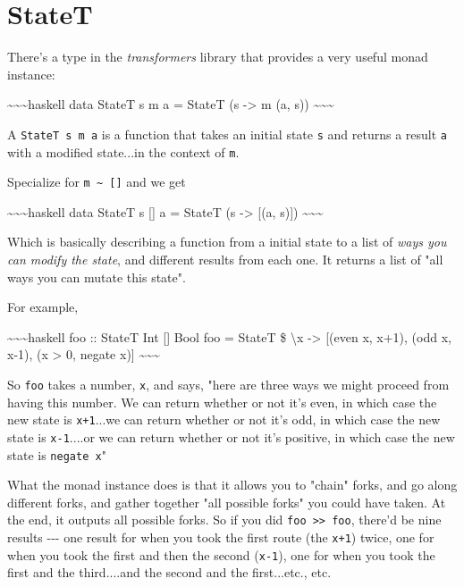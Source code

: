 \documentclass[]{article}
\begin{document}
\section{StateT}

There's a type in the \emph{transformers} library that provides a very useful
monad instance:

\textasciitilde{}\textasciitilde{}\textasciitilde{}haskell data StateT s m a =
StateT (s -\textgreater{} m (a, s))
\textasciitilde{}\textasciitilde{}\textasciitilde{}

A \texttt{StateT\ s\ m\ a} is a function that takes an initial state \texttt{s}
and returns a result \texttt{a} with a modified state...in the context of
\texttt{m}.

Specialize for \texttt{m\ \textasciitilde{}\ {[}{]}} and we get

\textasciitilde{}\textasciitilde{}\textasciitilde{}haskell data StateT s {[}{]}
a = StateT (s -\textgreater{} {[}(a, s){]})
\textasciitilde{}\textasciitilde{}\textasciitilde{}

Which is basically describing a function from a initial state to a list of
\emph{ways you can modify the state}, and different results from each one. It
returns a list of "all ways you can mutate this state".

For example,

\textasciitilde{}\textasciitilde{}\textasciitilde{}haskell foo :: StateT Int
{[}{]} Bool foo = StateT \$ \textbackslash{}x -\textgreater{} {[}(even x, x+1),
(odd x, x-1), (x \textgreater{} 0, negate x){]}
\textasciitilde{}\textasciitilde{}\textasciitilde{}

So \texttt{foo} takes a number, \texttt{x}, and says, "here are three ways we
might proceed from having this number. We can return whether or not it's even,
in which case the new state is \texttt{x+1}...we can return whether or not it's
odd, in which case the new state is \texttt{x-1}....or we can return whether or
not it's positive, in which case the new state is \texttt{negate\ x}"

What the monad instance does is that it allows you to "chain" forks, and go
along different forks, and gather together "all possible forks" you could have
taken. At the end, it outputs all possible forks. So if you did
\texttt{foo\ \textgreater{}\textgreater{}\ foo}, there'd be nine results -\/-\/-
one result for when you took the first route (the \texttt{x+1}) twice, one for
when you took the first and then the second (\texttt{x-1}), one for when you
took the first and the third....and the second and the first...etc., etc.
\end{document}
